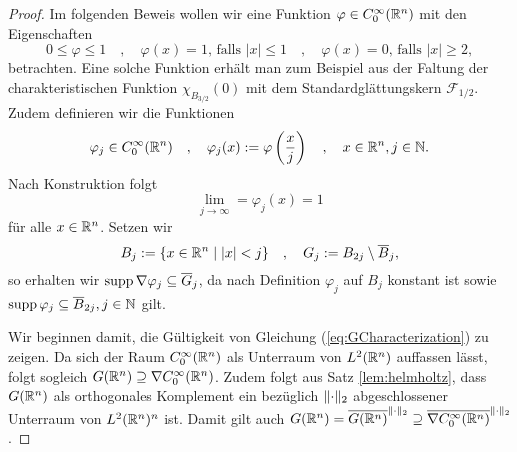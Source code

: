 \begin{proof}
  Im folgenden Beweis wollen wir eine Funktion $\varphi \in C_0^\infty(\mathbb{R}^n)$ mit den Eigenschaften
  \begin{equation}
    \label{eq:propPhi}
  0 \leq \varphi \leq 1
  \quad,\quad
  \varphi(x) = 1 \text{, falls } |x| \leq 1
  \quad,\quad
  \varphi(x) = 0 \text{, falls } |x| \geq 2,
\end{equation}
  betrachten.
  Eine solche Funktion erhält man zum Beispiel aus der Faltung der charakteristischen Funktion $\chi_{B_{3/2}}(0)$ mit dem Standardglättungskern $\mathcal{F}_{1/2}$.
  Zudem definieren wir die Funktionen
  $$
  \varphi_j \in C_0^\infty(\mathbb{R}^n)
  \quad,\quad
  \varphi_j(x) := \varphi\left(\frac{x}{j}\right)
  \quad,\quad
  x \in \mathbb{R}^n, j \in \mathbb{N}.
  $$
  Nach Konstruktion folgt 
  \begin{equation}
    \label{eq:limPhi}
    \lim_{j \to \infty} = \varphi_j(x) = 1
  \end{equation}
  für alle $x \in \mathbb{R}^n$.
  Setzen wir
  $$
  B_j := \{ x \in \mathbb{R}^n \mid |x| < j \} 
  \quad,\quad
  G_j := B_{2j}\setminus \overline B_j,
  $$
  so erhalten wir $\operatorname{supp} \nabla \varphi_j \subseteq \overline G_j$, da nach Definition $\varphi_j$ auf $B_j$ konstant ist sowie $\operatorname{supp} \varphi_j \subseteq \overline B_{2j}, j \in \mathbb{N}$ gilt.

  Wir beginnen damit, die Gültigkeit von Gleichung (\ref{eq:GCharacterization}) zu zeigen.
  Da sich der Raum $C_0^\infty(\mathbb{R}^n)$ als Unterraum von $L^2(\mathbb{R}^n)$ auffassen lässt, folgt sogleich $G(\mathbb{R}^n) \supseteq \nabla C_0^\infty(\mathbb{R}^n)$.
  Zudem folgt aus Satz \ref{lem:helmholtz}, dass $G(\mathbb{R}^n)$ als orthogonales Komplement ein bezüglich $\lVert \cdot \rVert_2$ abgeschlossener Unterraum von $L^2(\mathbb{R}^n)^n$ ist.
  Damit gilt auch $G(\mathbb{R}^n) = \overline{G(\mathbb{R}^n)}^{\lVert \cdot \rVert_2} \supseteq \overline{\nabla C_0^\infty(\mathbb{R}^n)}^{\lVert \cdot \rVert_2}$.


\end{proof}
